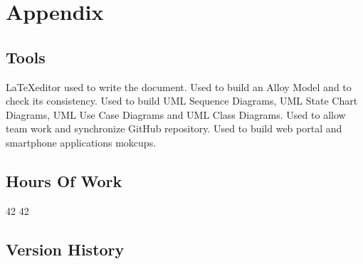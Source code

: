 \section{Appendix}

\subsection{Tools}
\begin{itemize}
	 \LaTeX editor used to write the document.
	 Used to build an Alloy Model and to check its consistency.
	 Used to build UML Sequence Diagrams, UML State Chart Diagrams, UML Use Case Diagrams and UML Class Diagrams.
	 Used to allow team work and synchronize GitHub repository.
	 Used to build web portal and smartphone applications mokcups.
\end{itemize}

\subsection{Hours Of Work}
\begin{itemize}
	 42
	 42
\end{itemize}

\subsection{Version History}
